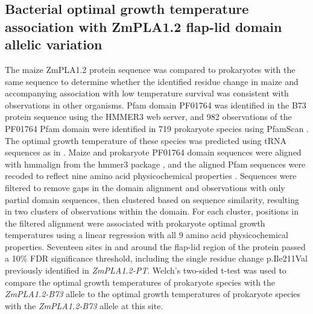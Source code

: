 \documentclass[9pt,twocolumn,twoside]{BioRxiv}
\begin{document}
\subsection{Bacterial optimal growth temperature association with ZmPLA1.2 flap-lid domain allelic variation}

The maize ZmPLA1.2 protein sequence was compared to prokaryotes with the same sequence to determine whether the identified residue change in maize and accompanying association with low temperature survival was consistent with observations in other organisms. 
Pfam domain PF01764 was identified in the B73 protein sequence using the HMMER3 web server, and 982 observations of the PF01764 Pfam domain were identified in 719 prokaryote species using PfamScan \cite{Potter2018-tk, El-Gebali2019-pw}. 
The optimal growth temperature of these species was predicted using tRNA sequences as in \cite{Cimen2020-dm}. 
Maize and prokaryote PF01764 domain sequences were aligned with hmmalign from the hmmer3 package \cite{Eddy2011-pd}, and the aligned Pfam sequences were recoded to reflect nine amino acid physicochemical properties \cite{Li2016-ut}. 
Sequences were filtered to remove gaps in the domain alignment and observations with only partial domain sequences, then clustered based on sequence similarity, resulting in two clusters of observations within the domain. 
For each cluster, positions in the filtered alignment were associated with prokaryote optimal growth temperatures using a linear regression with all 9 amino acid physicochemical properties. 
Seventeen sites in and around the flap-lid region of the protein passed a 10\% FDR significance threshold, including the single residue change p.Ile211Val previously identified in \textit{ZmPLA1.2-PT}. 
Welch’s two-sided t-test was used to compare the optimal growth temperatures of prokaryote species with the \textit{ZmPLA1.2-B73} allele to the optimal growth temperatures of prokaryote species with the \textit{ZmPLA1.2-B73} allele at this site.
\end{document}
